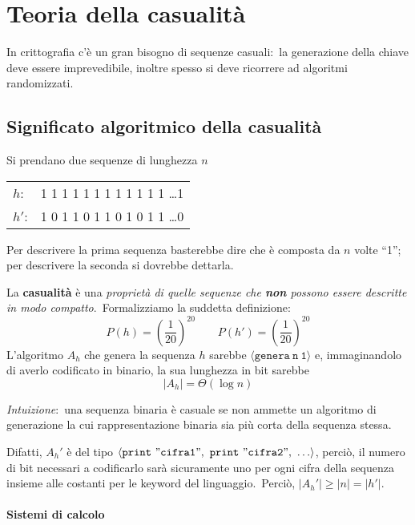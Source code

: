 \chapter{Teoria della casualità}

In crittografia c'è un gran bisogno di sequenze casuali:\ la generazione della chiave deve essere imprevedibile, inoltre spesso si deve ricorrere ad algoritmi randomizzati.\

\section{Significato algoritmico della casualità}

Si prendano due sequenze di lunghezza $n$

\begin{table}[H]
    \centering
    \begin{tabular}{l l}
        $h$:  & 1 1 1 1 1 1 1 1 1 1 1 1 \dots 1 \\
        $h'$: & 1 0 1 1 0 1 1 0 1 0 1 1 \dots 0 \\
    \end{tabular}
\end{table}

\noindent Per descrivere la prima sequenza basterebbe dire che è composta da $n$ volte ``1''; per descrivere la seconda si dovrebbe dettarla.\

La \textbf{casualità} è una \textit{proprietà di quelle sequenze che \textbf{non} possono essere descritte in modo compatto}.\
Formalizziamo la suddetta definizione:
\[P(h) = \left(\frac{1}{20}\right)^{20} \qquad P(h') = \left(\frac{1}{20}\right)^{20}\]
L'algoritmo $A_h$ che genera la sequenza $h$ sarebbe $\langle\mathtt{genera\ n\ 1}\rangle$ e, immaginandolo di averlo codificato in binario, la sua lunghezza in bit sarebbe
\[|A_h| = \Theta(\log n)\]

\vspace{12pt}
\noindent\textit{Intuizione}:\ una sequenza binaria è casuale se non ammette un algoritmo di generazione la cui rappresentazione binaria sia più corta della sequenza stessa.\
\vspace{12pt}

\noindent Difatti, $A_h'$ è del tipo $\langle \mathtt{print\ "cifra1",\ print\ "cifra2",\ \dots}\rangle$, perciò, il numero di bit necessari a codificarlo sarà sicuramente uno per ogni cifra della sequenza insieme alle costanti per le keyword del linguaggio.\
Perciò, $|A_ h'| \geq |n| = |h'|$.

\subsubsection{Sistemi di calcolo}

